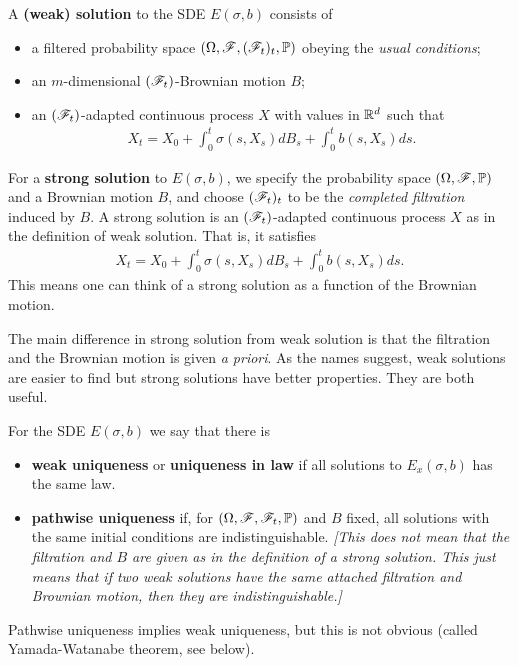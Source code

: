\documentclass[12pt,a4paper]{article}
\renewenvironment{i}
{\begin{itemize} 
	}%
	{\end{itemize}
}
\begin{document}
 A \textbf{(weak) solution} to the SDE $E(\sigma, b)$ consists of
\begin{i}
\item a filtered probability space $(\Omega, \mathscr{F}, (\mathscr{F}_t)_{t}, \mathbb{P})$ obeying the \emph{usual conditions};
\item an $m$-dimensional $(\mathscr{F}_t)$-Brownian motion $B$;
\item an $(\mathscr{F}_t)$-adapted continuous process $X$ with values in $\mathbb{R}^d$ such that
\begin{align*}
X_t = X_0 + \int_0^t \sigma(s, X_s) dB_s + \int_0^t b(s, X_s) ds.
\end{align*} 
\end{i}
\s

 For a \textbf{strong solution} to $E(\sigma, b)$, we specify the probability space $(\Omega, \mathscr{F}, \mathbb{P})$ and a Brownian motion $B$, and choose $(\mathscr{F}_t)_t$ to be the \emph{completed filtration} induced by $B$. A strong solution is an $(\mathscr{F}_t)$-adapted continuous process $X$ as in the definition of weak solution. That is, it satisfies
\begin{align*}
X_t = X_0 + \int_0^t \sigma(s, X_s) dB_s + \int_0^t b(s, X_s) ds.
\end{align*} 
This means one can think of a strong solution as a function of the Brownian motion.
\s

The main difference in strong solution from weak solution is that the filtration and the Brownian motion is given \textit{a priori}. As the names suggest, weak solutions are easier to find but strong solutions have better properties. They are both useful.
\s

 For the SDE $E(\sigma, b)$ we say that there is
\begin{i}
\item \textbf{weak uniqueness} or \textbf{uniqueness in law} if all solutions to $E_x(\sigma, b)$ has the same law.
\item \textbf{pathwise uniqueness} if, for $(\Omega, \mathscr{F}, \mathscr{F}_t, \mathbb{P})$ and $B$ fixed, all solutions with the same initial conditions are indistinguishable. \emph{[This does not mean that the filtration and $B$ are given as in the definition of a strong solution. This just means that if two weak solutions have the same attached filtration and Brownian motion, then they are indistinguishable.]}
\end{i}
Pathwise uniqueness implies weak uniqueness, but this is not obvious (called Yamada-Watanabe theorem, see below).
\s
\end{document}
